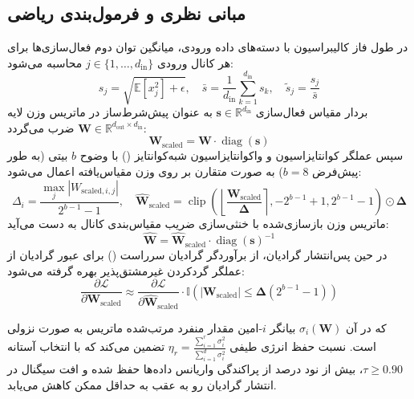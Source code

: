 \subsection{مبانی نظری و فرمول‌بندی ریاضی}
در طول فاز کالیبراسیون با دسته‌های داده ورودی، میانگین توان دوم فعال‌سازی‌ها برای هر کانال ورودی $j \in \{1, \dots, d_{\text{in}}\}$ محاسبه می‌شود:
\begin{equation}
s_j = \sqrt{\mathbb{E}[x_j^2] + \epsilon}, \quad \bar{s} = \frac{1}{d_{\text{in}}} \sum_{k=1}^{d_{\text{in}}} s_k, \quad \tilde{s}_j = \frac{s_j}{\bar{s}}
\end{equation}
بردار مقیاس فعال‌سازی $\mathbf{s} \in \mathbb{R}^{d_{\text{in}}}$ به عنوان پیش‌شرط‌ساز در ماتریس وزن لایه $\mathbf{W} \in \mathbb{R}^{d_{\text{out}} \times d_{\text{in}}}$ ضرب می‌گردد:
\begin{equation}
\mathbf{W}_{\text{scaled}} = \mathbf{W} \cdot \operatorname{diag}(\mathbf{s})
\end{equation}
سپس عملگر کوانتایزاسیون و واکوانتایزاسیون شبه‌کوانتایز () با وضوح $b$ بیتی (به طور پیش‌فرض $b=8$) به صورت متقارن بر روی وزن مقیاس‌یافته اعمال می‌شود:
\begin{equation}
\Delta_i = \frac{\max_j |W_{\text{scaled}, i, j}|}{2^{b-1} - 1}, \quad \widehat{\mathbf{W}}_{\text{scaled}} = \operatorname{clip}\left(\left\lfloor \frac{\mathbf{W}_{\text{scaled}}}{\mathbf{\Delta}} \right\rceil, -2^{b-1}+1, 2^{b-1}-1\right) \odot \mathbf{\Delta}
\end{equation}
ماتریس وزن بازسازی‌شده با خنثی‌سازی ضریب مقیاس‌بندی کانال به دست می‌آید:
\begin{equation}
\widehat{\mathbf{W}} = \widehat{\mathbf{W}}_{\text{scaled}} \cdot \operatorname{diag}(\mathbf{s})^{-1}
\end{equation}
در حین پس‌انتشار گرادیان، از برآوردگر گرادیان سرراست () برای عبور گرادیان از عملگر گردکردن غیرمشتق‌پذیر بهره گرفته می‌شود:
\begin{equation}
\frac{\partial \mathcal{L}}{\partial \mathbf{W}_{\text{scaled}}} \approx \frac{\partial \mathcal{L}}{\partial \widehat{\mathbf{W}}_{\text{scaled}}} \cdot \mathbb{I}\left(|\mathbf{W}_{\text{scaled}}| \le \mathbf{\Delta} (2^{b-1}-1)\right)
\end{equation}

که در آن $\sigma_i(\mathbf{W})$ بیانگر $i$-امین مقدار منفرد مرتب‌شده ماتریس به صورت نزولی است. نسبت حفظ انرژی طیفی $\eta_r = \frac{\sum_{i=1}^r \sigma_i^2}{\sum_{i=1}^{d} \sigma_i^2}$ تضمین می‌کند که با انتخاب آستانه $\tau \ge 0.90$، بیش از نود درصد از پراکندگی واریانس داده‌ها حفظ شده و افت سیگنال در انتشار گرادیان رو به عقب به حداقل ممکن کاهش می‌یابد.

